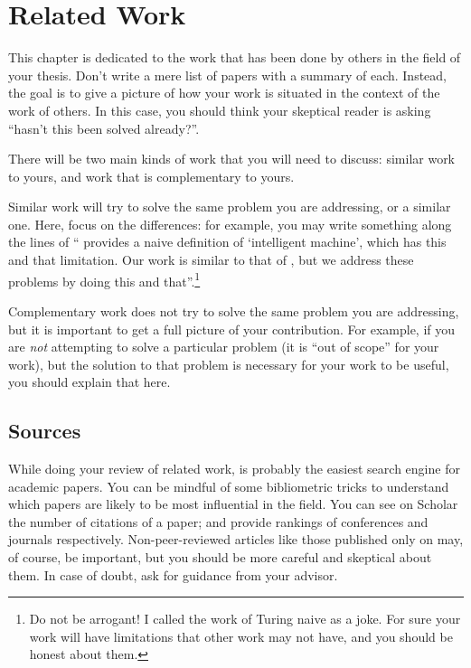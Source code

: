\chapter{Related Work}
\label{ch:related}

This chapter is dedicated to the work that has been done by others in the field of your thesis.
Don't write a mere list of papers with a summary of each. Instead, the goal is to give a picture
of how your work is situated in the context of the work of others. In this case, you should
think your skeptical reader is asking ``hasn't this been solved already?''.

There will be two main kinds of work that you will need to discuss: similar work
to yours, and work that is complementary to yours.

Similar work will try to solve the same problem you are addressing, or a similar one.
Here, focus on the differences: for example, you may write something along the
lines of ``\textcite{DBLP:journals/x/Turing50} provides a naive definition of
`intelligent machine', which has this and that limitation. Our work is similar to that of
\citeauthor{DBLP:journals/x/Turing50}, but we address these problems by doing this and
that''.\footnote{Do not be arrogant! I called the work of Turing naive as a joke.
For sure your work will have limitations that other work may not have, and you should be honest about them.}

Complementary work does not try to solve the same problem you are addressing, but it is
important to get a full picture of your contribution. For example, if you are
\emph{not} attempting to solve a particular problem (it is ``out of scope'' for your work),
but the solution to that problem is necessary for your work to be useful, you should explain
that here.

\section{Sources}

While doing your review of related work, 
is probably the easiest search engine for academic papers. You can be mindful of some
bibliometric tricks to understand which papers are likely to be most influential in the field.
You can see on Scholar the number of citations of a paper;
 and
 provide rankings of conferences and journals
respectively. Non-peer-reviewed articles like those published only on
 may, of course, be important, but you should be more careful
and skeptical about them. In case of doubt, ask for guidance from your advisor.

